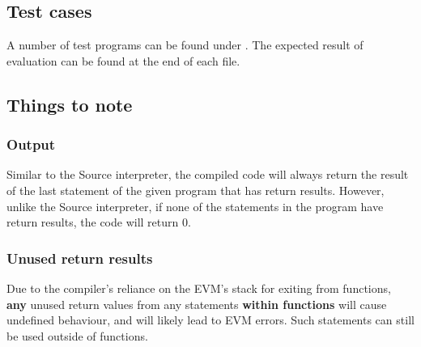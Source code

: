 \subsection{Test cases}
A number of test programs can be found under . The expected result of evaluation can be found at the end of each file. 

\subsection{Things to note}
\subsubsection{Output}
Similar to the Source interpreter, the compiled code will always return the result of the last statement of the given program that has return results. However, unlike the Source interpreter, if none of the statements in the program have return results, the code will return 0. 

\subsubsection{Unused return results}
Due to the compiler's reliance on the EVM's stack for exiting from functions, \textbf{any} unused return values from any statements \textbf{within functions} will cause undefined behaviour, and will likely lead to EVM errors. Such statements can still be used outside of functions.


